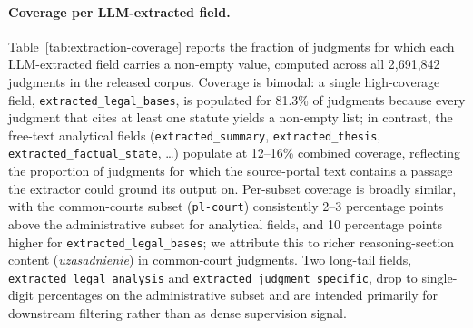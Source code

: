 \paragraph{Coverage per LLM-extracted field.}
Table~\ref{tab:extraction-coverage} reports the fraction of judgments for which each LLM-extracted field carries a non-empty value, computed across all 2{,}691{,}842 judgments in the released corpus. Coverage is bimodal: a single high-coverage field, \texttt{extracted\_legal\_bases}, is populated for 81.3\% of judgments because every judgment that cites at least one statute yields a non-empty list; in contrast, the free-text analytical fields (\texttt{extracted\_summary}, \texttt{extracted\_thesis}, \texttt{extracted\_factual\_state}, \dots) populate at 12--16\% combined coverage, reflecting the proportion of judgments for which the source-portal text contains a passage the extractor could ground its output on. Per-subset coverage is broadly similar, with the common-courts subset (\texttt{pl-court}) consistently 2--3 percentage points above the administrative subset for analytical fields, and 10 percentage points higher for \texttt{extracted\_legal\_bases}; we attribute this to richer reasoning-section content (\emph{uzasadnienie}) in common-court judgments. Two long-tail fields, \texttt{extracted\_legal\_analysis} and \texttt{extracted\_judgment\_specific}, drop to single-digit percentages on the administrative subset and are intended primarily for downstream filtering rather than as dense supervision signal.

